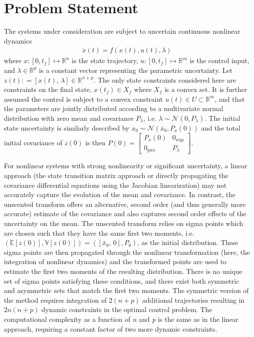 \documentclass[10pt,a4paper]{article}
\begin{document}
	\section{Problem Statement}
	
	The systems under consideration are subject to uncertain continuous nonlinear dynamics 
	\begin{align}
	\dot{x}(t) = f(x(t),u(t),\lambda) \label{eq_dynamics}
	\end{align}
	where $x:[0,t_f]\mapsto \mathbb{R}^n$ is the state trajectory, $u:[0,t_f]\mapsto \mathbb{R}^m$ is the control input, and $\lambda\in\mathbb{R}^p$ is a constant vector representing the parametric uncertainty. Let $z(t)\mathrel{:}=[x(t),\, \lambda]\in\mathbb{R}^{n+p}$. The only state constraints considered here are constraints on the final state, $x(t_f)\in X_f$ where $X_f$ is a convex set. It is further assumed the control is subject to a convex constraint $u(t) \in U \subset \mathbb{R}^m$, and that the parameters are jointly distributed according to a multivariate normal distribution with zero mean and covariance $P_{\lambda}$, i.e. $\lambda \sim \mathcal{N}(0,P_{\lambda})$. The initial state uncertainty is similarly described by $x_0 \sim \mathcal{N}(\bar{x}_0,P_x(0))$ and the total initial covariance of $z(0)$ is then $P(0) = \left[\begin{array}{cc}
		P_{x}(0)& 0_{n\mathrm{x}p} \\
		 0_{p\mathrm{x}n} & P_{\lambda}
		\end{array}\right]$.
	
	For nonlinear systems with strong nonlinearity or significant uncertainty, a linear approach (the state transition matrix approach or directly propagating the covariance differential equations using the Jacobian linearization) may not accurately capture the evolution of the mean and covariance. In contrast, the unscented transform \cite{UT,UKF1} offers an alternative, second order (and thus generally more accurate) estimate of the covariance and also captures second order effects of the uncertainty on the mean. The unscented transform relies on sigma points which are chosen such that they have the same first two moments, i.e. $ (\mathbb{E}[z(0)],\mathbb{V}[z(0)]) = ([\bar{x}_0,\,0],P_0) $, as the initial distribution. These sigma points are then propagated through the nonlinear transformation (here, the integration of nonlinear dynamics) and the transformed points are used to estimate the first two moments of the resulting distribution. There is no unique set of sigma points satisfying these conditions, and there exist both symmetric and asymmetric sets \cite{UT_simplex} that match the first two moments. The symmetric version of the method requires integration of $2(n+p)$ additional trajectories resulting in $2n(n+p)$ dynamic constraints in the optimal control problem. The computational complexity as a function of \textit{n} and \textit{p} is the same as in the linear approach, requiring a constant factor of two more dynamic constraints. 
	
\end{document}
